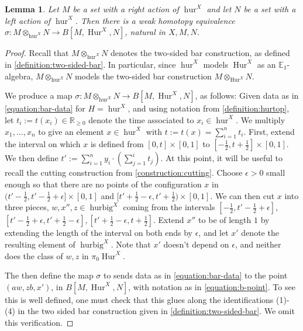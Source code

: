 \documentclass[12 pt]{amsart}
\theoremstyle{plain}
\newtheorem{lemma}[theorem]{Lemma}
\theoremstyle{definition}
\theoremstyle{remark}
\numberwithin{equation}{section}
\DeclareMathOperator\Hur{Hur}
\newcommand\RR{\mathbb{R}}
\newcommand\EE{\mathbb{E}}
\begin{document}
\begin{lemma}\label{lemma:maincomparison}
	Let $M$ be a set with a right action of $\operatorname{hur}^{X}$ and let
	$N$ be a set with a left action of $\operatorname{hur}^X$. Then there is a weak homotopy equivalence $\sigma: M\otimes_{\operatorname{hur}^{X}}N\to B[M,\Hur^{X},N]$, natural in $X,M,N$.
\end{lemma}
\begin{proof}
	Recall that $M\otimes_{\operatorname{hur}^{X}}N$ denotes the two-sided bar
	construction, as defined in \autoref{definition:two-sided-bar}.
	In particular, since $\operatorname{hur}^{X}$ models $\Hur^{X}$ as an $\EE_1$-algebra, $M
	\otimes_{\operatorname{hur}^{X}} N$ models the two-sided bar construction $M\otimes_{\Hur^{X}}N$.
	
	We produce a map $\sigma: M\otimes_{\operatorname{hur}^{X}}N \to B[M,\Hur^{X},N]$, as follows: 
	Given data as in \eqref{equation:bar-data} for $H = \operatorname{hur}^{X}$, and using notation from
	\autoref{definition:hurtop},
	let $t_i := t(x_i) \in \RR_{\geq 0}$ 
	denote the time associated to $x_i \in
	\operatorname{hur}^{X}$. 
	We multiply $x_1,\ldots,x_n$ to give an element $x \in
	\operatorname{hur}^{X}$ with $t := t(x) =\sum_{i=1}^n t_i$. First, extend the interval on which $x$ is defined from $[0,t]\times [0,1]$ to $[-\frac 1 2,t+\frac 1 2]\times [0,1]$.
	We then define $t' := \sum_{i=1}^n
	y_{i} \cdot (\sum_{j=1}^it_j)$. 
	At this point, it will be useful to recall the cutting construction from
	\autoref{construction:cutting}.
	Choose $\epsilon>0$ small enough so that there are no points of the
	configuration $x$ in $(t'-\frac 1 2,t'-\frac 1 2+\epsilon]\times [0,1]$ and $[t'+\frac 1 2-\epsilon,t'+\frac 1 2)\times [0,1]$. We can then cut $x$ into three pieces, $w,x'',z \in \operatorname{hurbig}^X$ coming from the intervals $[-\frac 1 2,t'-\frac 1 2+\epsilon]$, $[t'-\frac 1 2+\epsilon,t'+\frac 1 2-\epsilon], [t'+\frac 1 2-\epsilon,t+\frac 1 2]$.
 Extend $x''$ to be of length $1$ by extending the length of the interval on
 both ends by $\epsilon$, and let $x'$ denote the resulting element of $\operatorname{hurbig}^X$. Note that $x'$ doesn't depend on $\epsilon$, and neither does the class of $w,z$ in $\pi_0\Hur^X$.
	
	The then define the map $\sigma$ to sends data as in
	\eqref{equation:bar-data} to the point $(aw,zb,x')$,
	in $B[M,\Hur^{X},N]$, with notation as in \eqref{equation:b-point}. To
	see this is well defined, one must check that this glues along the
	identifications (1)-(4) in the two sided bar construction
	given in
	\autoref{definition:two-sided-bar}.
	We omit this verification.
	

\end{proof}
\end{document}
